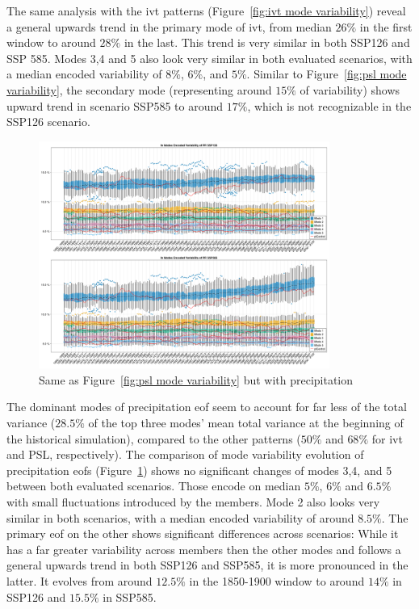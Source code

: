 The same analysis with the \ac{ivt} patterns (Figure~\ref{fig:ivt mode variability}) reveal a general upwards trend in the primary mode of \ac{ivt}, from median $26\%$ in the first window to around $28\%$ in the last. 
This trend is very similar in both SSP126 and SSP 585. 
Modes 3,4 and 5 also look very similar in both evaluated scenarios, with a median encoded variability of $8\%$, $6\%$, and $5\%$. 
Similar to Figure~\ref{fig:psl mode variability}, the secondary mode (representing around $15\%$ of variability) shows upward trend in scenario SSP585 to around $17\%$, which is not recognizable in the SSP126 scenario. 

\begin{figure}[htb]
  \begin{center}
    \includegraphics[width=0.85\textwidth]{figures/mode_variability_pr_50seasons.png}
  \end{center}
  \caption{Same as Figure~\ref{fig:psl mode variability} but with precipitation}\label{fig:pr mode variability}
\end{figure}

The dominant modes of precipitation \ac{eof} seem to account for far less of the total variance ($28.5 \%$ of the top three modes' mean total variance at the beginning of the historical simulation), compared to the other patterns ($50 \%$ and $68 \%$ for \ac{ivt} and PSL, respectively).  
The comparison of mode variability evolution of precipitation \acp{eof} (Figure~\ref{fig:pr mode variability}) shows no significant changes of modes 3,4, and 5 between both evaluated scenarios. 
Those encode on median $5\%$, $6\%$ and $6.5\%$ with small fluctuations introduced by the members. 
Mode 2 also looks very similar in both scenarios, with a median encoded variability of around $8.5\%$. 
The primary \ac{eof} on the other shows significant differences across scenarios: While it has a far greater variability across members then the other modes and follows a general upwards trend in both SSP126 and SSP585, it is more pronounced in the latter. 
It evolves from around $12.5\%$ in the 1850-1900 window to around $14\%$ in SSP126 and $15.5\%$ in SSP585.  


